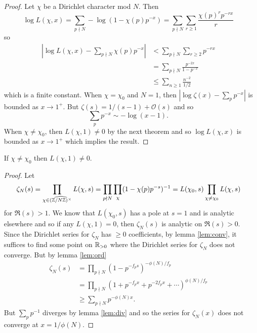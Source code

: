 \documentclass{memoir}
\begin{document}
\begin{proof}
    Let $\chi$ be a Dirichlet character mod $N$.
    Then
    \begin{equation}
        \log L(\chi,x) = \sum_{p\nmid N} -\log(1-\chi(p)p^{-x}) = \sum_{p\nmid N} \sum_{r\ge 1} \frac{\chi(p)^rp^{-rx}}r
    \end{equation}
    so
    \begin{align}
        \left|\log L(\chi,x) - \sum_{p\nmid N}\chi(p)p^{-x}\right| &< \sum_{p\nmid N} \sum_{r\ge 2}p^{-rx} \nonumber \\
                                                                   &= \sum_{p\nmid N} \frac{p^{-2x}}{1-p^{-x}} \nonumber \\
                                                                   &\le \sum_{n\ge 1} \frac{n^{-2}}{1/2}
    \end{align}
    which is a finite constant.
    When $\chi=\chi_0$ and $N=1$, then $|\log\zeta(x)-\sum_{p}p^{-x}|$ is bounded as $x\to1^+$.
    But $\zeta(s) = 1/(s-1)+\mathcal O(s)$ and so 
    \begin{equation}
        \sum_{p}p^{-x} \sim -\log(x-1).
    \end{equation}
    When $\chi\ne \chi_0$, then $L(\chi,1) \ne 0$ by the next theorem and so $\log L(\chi,x)$ is bounded as $x\to1^+$ which implies the result.
\end{proof}
\begin{thm}
    If $\chi \ne \chi_0$ then $L(\chi,1) \ne 0$.
\end{thm}
\begin{proof}
    Let 
    \begin{equation}
        \zeta_N(s) = \prod_{\chi \in \widehat{(\mathbb{Z}/N\mathbb{Z})^\times}} L(\chi,s) = \prod_{p\nmid N} \prod_{\chi}(1-\chi(p)p^{-s})^{-1} = L(\chi_0,s)\prod_{\chi\ne\chi_0}L(\chi,s)
    \end{equation}
    for $\Re(s)>1$.
    We know that $L(\chi_0,s)$ has a pole at $s = 1$ and is analytic elsewhere and so if any $L(\chi,1) = 0$, then $\zeta_N(s)$ is analytic on $\Re(s)>0$.
    Since the Dirichlet series for $\zeta_N$ has $\ge0$ coefficients, by lemma \ref{lem:conv}, it suffices to find some point on $\mathbb{R}_{>0}$ where the Dirichlet series for $\zeta_N$ does not converge.
    But by lemma \ref{lem:ord}
    \begin{align}
        \zeta_N(s) &= \prod_{p\nmid N} (1-p^{-f_ps})^{-\phi(N)/f_p} \nonumber \\
                   &= \prod_{p\nmid N} (1+p^{-f_px}+p^{-2f_px}+\cdots)^{\phi(N)/f_p} \nonumber \\
                   &\ge \sum_{p\nmid N} p^{-\phi(N)x}.
    \end{align}
    But $\sum_pp^{-1}$ diverges by lemma \ref{lem:div} and so the series for $\zeta_N(x)$ does not converge at $x=1/\phi(N)$.
\end{proof}
\end{document}
